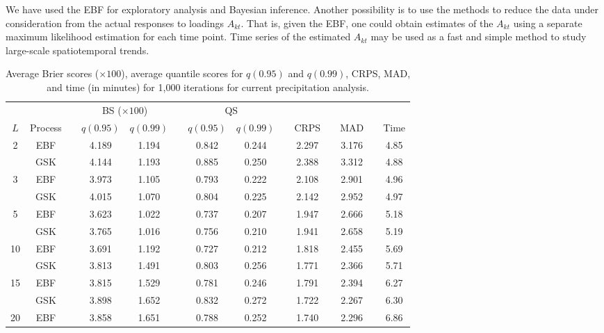 \documentclass[aoas]{imsart}
\begin{document}
We have used the EBF for exploratory analysis and Bayesian inference.
Another possibility is to use the methods to reduce the data under consideration from the actual responses to loadings $A_{kt}$.
That is, given the EBF, one could obtain estimates of the $A_{kt}$ using a separate maximum likelihood estimation for each time point.
Time series of the estimated $A_{kt}$ may be used as a fast and simple method to study large-scale spatiotemporal trends.

\begin{table}[htbp]
  \caption{Average Brier scores ($\times 100$), average quantile scores for $q(0.95)$ and $q(0.99)$, CRPS, MAD, and time (in minutes) for 1,000 iterations for current precipitation analysis.}
  \label{ebtbl:precip-scores}
  \footnotesize
  \centering
  \begin{tabular}{cc c cc c cc c c c c c c}
    \toprule
    & && \multicolumn{2}{c}{BS ($\times 100$)} && \multicolumn{2}{c}{QS} &&&&&& \\
    \cmidrule{4-5} \cmidrule{7-8}
    $L$ & Process & \phantom{a} & $q(0.95)$ & $q(0.99)$ & \phantom{a} & $q(0.95)$ & $q(0.99)$ & \phantom{a} & CRPS & \phantom{a} & MAD & \phantom{a} & Time\\
   \midrule																	
2	&	EBF	&&	4.189	&	1.194	&&	0.842	&	0.244	&&	2.297	&&	3.176	&&	4.85	\\
	&	GSK	&&	4.144	&	1.193	&&	0.885	&	0.250	&&	2.388	&&	3.312	&&	4.88	\\
\midrule																	
3	&	EBF	&&	3.973	&	1.105	&&	0.793	&	0.222	&&	2.108	&&	2.901	&&	4.96	\\
	&	GSK	&&	4.015	&	1.070	&&	0.804	&	0.225	&&	2.142	&&	2.952	&&	4.97	\\
\midrule																	
5	&	EBF	&&	3.623	&	1.022	&&	0.737	&	0.207	&&	1.947	&&	2.666	&&	5.18	\\
	&	GSK	&&	3.765	&	1.016	&&	0.756	&	0.210	&&	1.941	&&	2.658	&&	5.19	\\
\midrule																	
10	&	EBF	&&	3.691	&	1.192	&&	0.727	&	0.212	&&	1.818	&&	2.455	&&	5.69	\\
	&	GSK	&&	3.813	&	1.491	&&	0.803	&	0.256	&&	1.771	&&	2.366	&&	5.71	\\
\midrule																	
15	&	EBF	&&	3.815	&	1.529	&&	0.781	&	0.246	&&	1.791	&&	2.394	&&	6.27	\\
	&	GSK	&&	3.898	&	1.652	&&	0.832	&	0.272	&&	1.722	&&	2.267	&&	6.30	\\
\midrule																	
20	&	EBF	&&	3.858	&	1.651	&&	0.788	&	0.252	&&	1.740	&&	2.296	&&	6.86	\\

\end{tabular}
\end{table}
\end{document}
